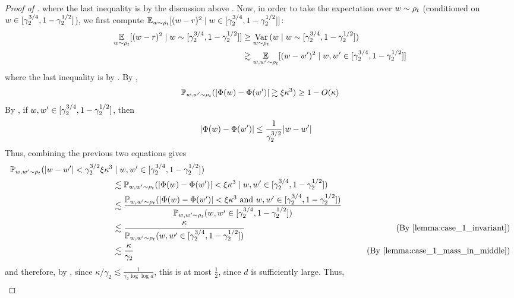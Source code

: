 \begin{proof}[Proof of ]
where the last inequality is by the discussion above . Now, in order to take the expectation over $w \sim \rho_t$ (conditioned on $w \in [\gamma_2^{3/4}, 1 - \gamma_2^{1/2}]$), we first compute $\operatorname*{\mathbb{E}}_{w \sim \rho_t} [(w - r)^2 \mid w \in [\gamma_2^{3/4}, 1 - \gamma_2^{1/2}]]$:
\begin{align}
\operatorname*{\mathbb{E}}_{w \sim \rho_t} [(w - r)^2 \mid w \sim [\gamma_2^{3/4}, 1 - \gamma_2^{1/2}]]
& \geq \operatorname*{Var}_{w \sim \rho_t}(w \mid w \sim [\gamma_2^{3/4}, 1 - \gamma_2^{1/2}]) \\
& \gtrsim \operatorname*{\mathbb{E}}_{w, w' \sim \rho_t} [(w - w')^2 \mid w, w' \in [\gamma_2^{3/4}, 1 - \gamma_2^{1/2}]] \label{eq:root_to_diff}
\end{align}
where the last inequality is by . By ,
\begin{align}
\mathbb{P}_{w, w' \sim \rho_t} (|\Phi(w) - \Phi(w')| \gtrsim \xi \kappa^3) \geq 1 - O(\kappa)
\end{align}
By , if $w, w' \in [\gamma_2^{3/4}, 1 - \gamma_2^{1/2}]$, then
\begin{align}
|\Phi(w) - \Phi(w')|
& \leq \frac{1}{\gamma_2^{3/2}} |w - w'|
\end{align}
Thus, combining the previous two equations gives
\begin{align}
\Prob_{\w, \w' \sim \rho_t}(|\w - \w'| < \gamma_2^{3/2} \xi\kappa^3 & \mid \w, \w' \in [\gamma_2^{3/4}, 1 - \gamma_2^{1/2}]) \\
& \lesssim \Prob_{\w, \w' \sim \rho_t}(|\potential(\w) - \potential(\w')| < \xi\kappa^3 \mid \w, \w' \in [\gamma_2^{3/4}, 1 - \gamma_2^{1/2}]) \\
& \lesssim \frac{\Prob_{\w, \w' \sim \rho_t}(|\potential(\w) - \potential(\w')| < \xi \kappa^3 \text{ and } \w, \w' \in [\gamma_2^{3/4}, 1 - \gamma_2^{1/2}])}{\Prob_{\w, \w' \sim \rho_t}(\w, \w' \in [\gamma_2^{3/4}, 1 - \gamma_2^{1/2}])} \\
& \lesssim \frac{\kappa}{\Prob_{\w, \w' \sim \rho_t}(\w, \w' \in [\gamma_2^{3/4}, 1 - \gamma_2^{1/2}])}
& \tag{By \Cref{lemma:case_1_invariant}} \\
& \lesssim \frac{\kappa}{\gamma_2}
& \tag{By \Cref{lemma:case_1_mass_in_middle}}
\end{align}
and therefore, by , since $\kappa/\gamma_2 \lesssim \frac{1}{\gamma_2 \log \log d}$, this is at most $\frac{1}{2}$, since $d$ is sufficiently large. Thus,
\begin{align}

\end{align}
\end{proof}
